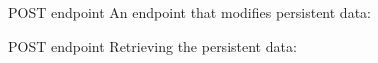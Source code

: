 \documentclass[../index.tex]{subfiles}
\begin{document}
\begin{frame}[fragile]{\currenttitle}
\end{frame}

\renewcommand{\currenttitle}{POST endpoint}
\begin{frame}[fragile]{\currenttitle}
  An endpoint that modifies persistent data: \\
  \vspace*{1em}

\end{frame}

\begin{frame}[fragile]{\currenttitle}
  Retrieving the persistent data: \\
  \vspace*{1em}

\end{frame}

\end{document}
